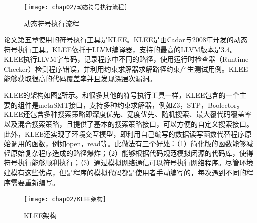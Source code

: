 \begin{figure}[h]
\begin{center}
\texttt{[image: chap02/动态符号执行流程]}
\end{center}
\caption{动态符号执行流程}
\label{动态符号执行流程}
\end{figure}

论文第五章使用的符号执行工具是KLEE。KLEE是由Cadar与2008年开发的动态符号执行工具。KLEE依托于LLVM编译器，支持的最高的LLVM版本是3.4。KLEE执行LLVM字节码，记录程序中不同的路径，使用运行时检查器（Runtime Checker）检测程序错误，并利用约束求解器求解路径约束产生测试用例。KLEE能够获取很高的代码覆盖率并且发现深层次漏洞。

KLEE的架构如图\ref{KLEE架构}所示。和很多其他的符号执行工具一样，KLEE包含的一个主要的组件是metaSMT接口，支持多种约束求解器，例如Z3，STP，Boolector。KLEE还包含多种搜索策略即深度优先、宽度优先、随机搜索、最大覆代码覆盖率以及混合搜索策略，且提供了基本的搜索策略接口，可以方便的自定义搜索接口。此外，KLEE还实现了环境交互模型，即利用自己编写的数据读写函数代替程序原始调用的函数，例如open，read等。此做法有三个好处：（1）简化版的函数能够减轻原始复杂程序造成的路径爆炸；（2）能够根据代码规范模拟闭源的代码库，使得符号执行能够顺利执行；（3）通过模拟网络通信可以符号执行网络程序。尽管环境建模有这些优点，但是程序的模拟代码都是使用者手动编写的，每次遇到不同的程序需要重新编写。

\begin{figure}[h]
\begin{center}
\texttt{[image: chap02/KLEE架构]}
\end{center}
\caption{KLEE架构}
\label{KLEE架构}
\end{figure}


